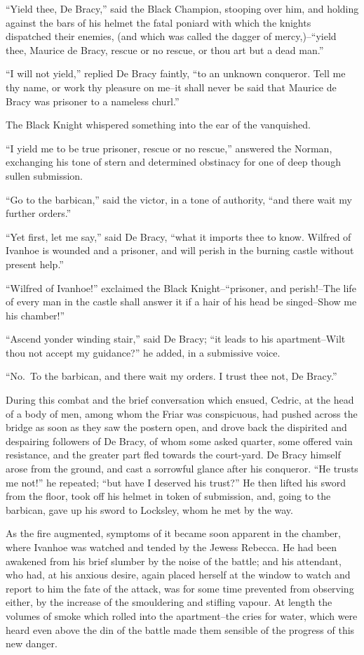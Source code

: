 ``Yield thee, De Bracy,'' said the Black Champion, stooping over him,
and holding against the bars of his helmet the fatal poniard with which
the knights dispatched their enemies, (and which was called the dagger
of mercy,)--``yield thee, Maurice de Bracy, rescue or no rescue, or thou
art but a dead man.''

``I will not yield,'' replied De Bracy faintly, ``to an unknown
conqueror. Tell me thy name, or work thy pleasure on me--it shall never
be said that Maurice de Bracy was prisoner to a nameless churl.''

The Black Knight whispered something into the ear of the vanquished.

``I yield me to be true prisoner, rescue or no rescue,'' answered the
Norman, exchanging his tone of stern and determined obstinacy for one of
deep though sullen submission.

``Go to the barbican,'' said the victor, in a tone of authority, ``and
there wait my further orders.''

``Yet first, let me say,'' said De Bracy, ``what it imports thee to
know. Wilfred of Ivanhoe is wounded and a prisoner, and will perish in
the burning castle without present help.''

``Wilfred of Ivanhoe!'' exclaimed the Black Knight--``prisoner, and
perish!--The life of every man in the castle shall answer it if a hair
of his head be singed--Show me his chamber!''

``Ascend yonder winding stair,'' said De Bracy; ``it leads to his
apartment--Wilt thou not accept my guidance?'' he added, in a submissive
voice.

``No.~To the barbican, and there wait my orders. I trust thee not, De
Bracy.''

During this combat and the brief conversation which ensued, Cedric, at
the head of a body of men, among whom the Friar was conspicuous, had
pushed across the bridge as soon as they saw the postern open, and drove
back the dispirited and despairing followers of De Bracy, of whom some
asked quarter, some offered vain resistance, and the greater part fled
towards the court-yard. De Bracy himself arose from the ground, and cast
a sorrowful glance after his conqueror. ``He trusts me not!'' he
repeated; ``but have I deserved his trust?'' He then lifted his sword
from the floor, took off his helmet in token of submission, and, going
to the barbican, gave up his sword to Locksley, whom he met by the way.

As the fire augmented, symptoms of it became soon apparent in the
chamber, where Ivanhoe was watched and tended by the Jewess Rebecca. He
had been awakened from his brief slumber by the noise of the battle; and
his attendant, who had, at his anxious desire, again placed herself at
the window to watch and report to him the fate of the attack, was for
some time prevented from observing either, by the increase of the
smouldering and stifling vapour. At length the volumes of smoke which
rolled into the apartment--the cries for water, which were heard even
above the din of the battle made them sensible of the progress of this
new danger.

